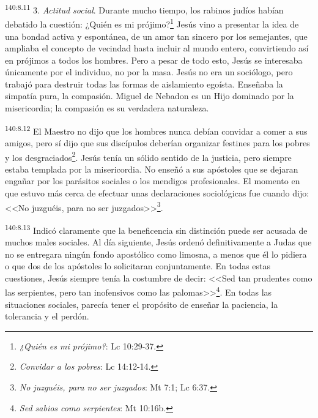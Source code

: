 \par 
\textsuperscript{140:8.11} 3. \textit{Actitud social}. Durante mucho tiempo, los rabinos judíos habían debatido la cuestión: ¿Quién es mi prójimo?\footnote{\textit{¿Quién es mi prójimo?}: Lc 10:29-37.} Jesús vino a presentar la idea de una bondad activa y espontánea, de un amor tan sincero por los semejantes, que ampliaba el concepto de vecindad hasta incluir al mundo entero, convirtiendo así en prójimos a todos los hombres. Pero a pesar de todo esto, Jesús se interesaba únicamente por el individuo, no por la masa. Jesús no era un sociólogo, pero trabajó para destruir todas las formas de aislamiento egoísta. Enseñaba la simpatía pura, la compasión. Miguel de Nebadon es un Hijo dominado por la misericordia; la compasión es su verdadera naturaleza.

\par 
\textsuperscript{140:8.12} El Maestro no dijo que los hombres nunca debían convidar a comer a sus amigos, pero sí dijo que sus discípulos deberían organizar festines para los pobres y los desgraciados\footnote{\textit{Convidar a los pobres}: Lc 14:12-14.}. Jesús tenía un sólido sentido de la justicia, pero siempre estaba templada por la misericordia. No enseñó a sus apóstoles que se dejaran engañar por los parásitos sociales o los mendigos profesionales. El momento en que estuvo más cerca de efectuar unas declaraciones sociológicas fue cuando dijo: <<No juzguéis, para no ser juzgados>>\footnote{\textit{No juzguéis, para no ser juzgados}: Mt 7:1; Lc 6:37.}.

\par 
\textsuperscript{140:8.13} Indicó claramente que la beneficencia sin distinción puede ser acusada de muchos males sociales. Al día siguiente, Jesús ordenó definitivamente a Judas que no se entregara ningún fondo apostólico como limosna, a menos que él lo pidiera o que dos de los apóstoles lo solicitaran conjuntamente. En todas estas cuestiones, Jesús siempre tenía la costumbre de decir: <<Sed tan prudentes como las serpientes, pero tan inofensivos como las palomas>>\footnote{\textit{Sed sabios como serpientes}: Mt 10:16b.}. En todas las situaciones sociales, parecía tener el propósito de enseñar la paciencia, la tolerancia y el perdón.

